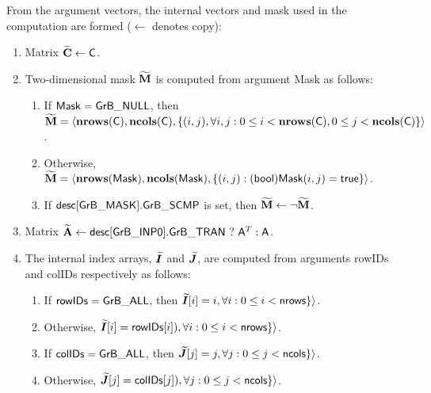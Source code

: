 From the argument vectors, the internal vectors and mask used in 
the computation are formed ($\leftarrow$ denotes copy):
\begin{enumerate}
    
	\item Matrix ${\bf \widetilde{C}} \leftarrow {\sf C}$.

	\item Two-dimensional mask ${\bf \widetilde{M}}$ is computed from argument {\sf Mask} as follows:
	\begin{enumerate}

		\item	If ${\sf Mask} = {\sf GrB\_NULL}$, then ${\bf \widetilde{M}} = \langle \bold{nrows}({\sf C}), \bold{ncols}({\sf C}), \{(i,j), \forall i,j : 0 \leq i <  \bold{nrows}({\sf C}), 0 \leq j < \bold{ncols}({\sf C}) \} \rangle$.

		\item	Otherwise, ${\bf \widetilde{M}} = \langle \bold{nrows}({\sf Mask}), \bold{ncols}({\sf Mask}), \{(i,j) : ({\sf bool}){\sf Mask}(i,j) = {\sf true}\} \rangle$.

		\item	If ${\sf desc[GrB\_MASK].GrB\_SCMP}$ is set, then ${\bf \widetilde{M}} \leftarrow \neg {\bf \widetilde{M}}$.

	\end{enumerate}

	\item Matrix ${\bf \widetilde{A}} \leftarrow {\sf desc[GrB\_INP0].GrB\_TRAN} \ ? \ {\sf A}^T : {\sf A}$.

	\item The internal index arrays, $\bm{\widetilde{I}}$ and $\bm{\widetilde{J}}$, are computed from arguments {\sf rowIDs} and {\sf colIDs} respectively as follows:
	\begin{enumerate}
	\item	If ${\sf rowIDs} = {\sf GrB\_ALL}$, then $\bm{\widetilde{I}}[i] = i               , \forall i : 0 \leq i < {\sf nrows} \} \rangle$.
	\item	Otherwise,                               $\bm{\widetilde{I}}[i] = {\sf rowIDs}[i]), \forall i : 0 \leq i < {\sf nrows} \} \rangle$.
	\item	If ${\sf colIDs} = {\sf GrB\_ALL}$, then $\bm{\widetilde{J}}[j] = j               , \forall j : 0 \leq j < {\sf ncols} \} \rangle$.
	\item	Otherwise,                               $\bm{\widetilde{J}}[j] = {\sf colIDs}[j]), \forall j : 0 \leq j < {\sf ncols} \} \rangle$.
        \end{enumerate}
\end{enumerate}

